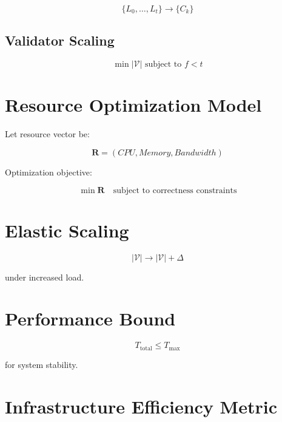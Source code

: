 \begin{equation}
\{L_0, \dots, L_t\} \rightarrow \{C_k\}
\end{equation}

\subsection{Validator Scaling}

\begin{equation}
\min |\mathcal{V}| \text{ subject to } f < t
\end{equation}

\section{Resource Optimization Model}

Let resource vector be:

\begin{equation}
\mathbf{R} = (CPU, Memory, Bandwidth)
\end{equation}

Optimization objective:

\begin{equation}
\min \mathbf{R} \quad \text{subject to correctness constraints}
\end{equation}

\section{Elastic Scaling}

\begin{equation}
|\mathcal{V}| \rightarrow |\mathcal{V}| + \Delta
\end{equation}

under increased load.

\section{Performance Bound}

\begin{equation}
T_{\text{total}} \leq T_{\max}
\end{equation}

for system stability.

\section{Infrastructure Efficiency Metric}

